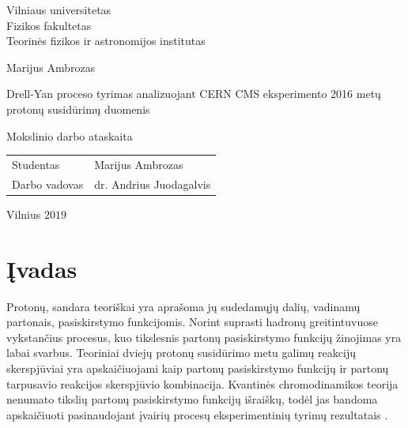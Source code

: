 \documentclass[a4paper, 12pt]{article}
\begin{document}

\begin{titlepage}
\centering
{\large Vilniaus universitetas \\ Fizikos fakultetas \\ Teorinės fizikos ir astronomijos institutas \par}
\vspace{3.5cm}
{\Large Marijus Ambrozas \par}
\vspace{0.3cm}
{\Large Drell-Yan proceso tyrimas analizuojant CERN CMS eksperimento 2016 metų protonų susidūrimų duomenis \par}
\vspace{0.8cm}
{\large Mokslinio darbo ataskaita \par}
\vspace{0.8cm}
\vspace{3.5cm}
{\large \begin{tabular*}{0.9\textwidth}{@{\extracolsep{\fill}}ll}
Studentas & Marijus Ambrozas\tabularnewline[0.5cm]
Darbo vadovas & dr. Andrius Juodagalvis\tabularnewline[0.5cm]
\end{tabular*} \par}
\vspace{4cm}
{\large Vilnius $2019$\par}
\end{titlepage}


\clearpage
\addtocounter{page}{1}
\tableofcontents
\clearpage

\section*{Įvadas} 

Protonų, sandara teoriškai yra aprašoma jų sudedamųjų dalių, vadinamų partonais, pasiskirstymo funkcijomis.
Norint suprasti hadronų greitintuvuose vykstančius procesus, kuo tikslesnis partonų pasiskirstymo funkcijų
žinojimas yra labai svarbus.
Teoriniai dviejų protonų susidūrimo metu galimų reakcijų skerspjūviai yra apskaičiuojami kaip
partonų pasiskirstymo funkcijų ir partonų tarpusavio reakcijos skerspjūvio kombinacija.
Kvantinės chromodinamikos teorija nenumato tikslių partonų pasiskirstymo funkcijų išraiškų, todėl jas bandoma
apskaičiuoti pasinaudojant įvairių procesų eksperimentinių tyrimų rezultatais \cite{NNPDF}.
\end{document}
